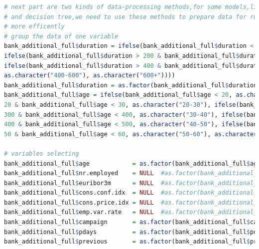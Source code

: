 \documentclass[12pt, a4paper, bibliography=totoc, english]{scrartcl}
\begin{document}
\begin{lstlisting}[language = R]
# next part are two kinds of data-processing methods,for some models,like random forest
# and decision tree,we need to use these methods to prepare data for running the model
# more efficently 
# group the data of one variable
bank_additional_full$duration = ifelse(bank_additional_full$duration < 200, as.character("200-"), 
ifelse(bank_additional_full$duration > 200 & bank_additional_full$duration < 400, as.character("200-400"), 
ifelse(bank_additional_full$duration > 400 & bank_additional_full$duration < 600, 
as.character("400-600"), as.character("600+"))))
bank_additional_full$duration = as.factor(bank_additional_full$duration)
bank_additional_full$age = ifelse(bank_additional_full$age < 20, as.character("20-"), ifelse(bank_additional_full$age >= 
20 & bank_additional_full$age < 30, as.character("20-30"), ifelse(bank_additional_full$age >= 
300 & bank_additional_full$age < 400, as.character("30-40"), ifelse(bank_additional_full$age >= 
400 & bank_additional_full$age < 500, as.character("40-50"), ifelse(bank_additional_full$age >= 
50 & bank_additional_full$age < 60, as.character("50-60"), as.character("60+"))))))

# variables selecting
bank_additional_full$age            = as.factor(bank_additional_full$age)
bank_additional_full$nr.employed    = NULL  #as.factor(bank_additional_full$nr.employed)
bank_additional_full$euribor3m      = NULL  #as.factor(bank_additional_full$euribor3m)
bank_additional_full$cons.conf.idx  = NULL  #as.factor(bank_additional_full$cons.conf.idx)
bank_additional_full$cons.price.idx = NULL  #as.factor(bank_additional_full$cons.price.idx)
bank_additional_full$emp.var.rate   = NULL  #as.factor(bank_additional_full$emp.var.rate)
bank_additional_full$campaign       = as.factor(bank_additional_full$campaign)
bank_additional_full$pdays          = as.factor(bank_additional_full$pdays)
bank_additional_full$previous       = as.factor(bank_additional_full$previous)
\end{lstlisting}
\end{document}
